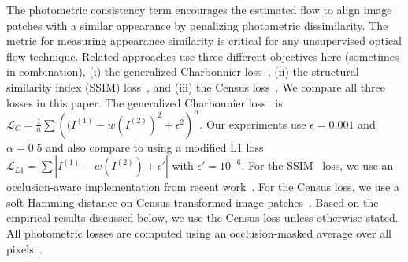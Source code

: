 \documentclass[runningheads]{llncs}
\newcommand{\lossfun}[1]{\mathcal{L}_\mathit{#1}}
\begin{document}
 The photometric consistency term encourages the estimated flow to align image patches with a similar appearance by penalizing photometric dissimilarity. The metric for measuring appearance similarity is critical for any unsupervised optical flow technique. Related approaches use three different objectives here (sometimes in combination), (i) the generalized Charbonnier loss~\cite{Janai2018ECCV,meister2018unflow,ren2017unsupervised,wang2018occlusion,jjyu2016unsupflow,Zhong2019UnsupervisedDE}, (ii) the structural similarity index (SSIM) loss~\cite{yin2018geonet,ranjan2019cvpr,wang2018unos}, and (iii) the Census loss~\cite{meister2018unflow,Zhong2019UnsupervisedDE,zou2018dfnet}. We compare all three losses in this paper.
The generalized Charbonnier loss~\cite{Sun2010} is $\lossfun{C}=\frac{1}{n}\sum\left((I^{(1)} - w(I^{(2)})^2 + \epsilon^2 \right)^\alpha$. Our experiments use $\epsilon=0.001$ and $\alpha=0.5$ and also compare to using a modified L1 loss $\lossfun{L1}=\sum|I^{(1)} - w(I^{(2)}) + \epsilon'|$ with $\epsilon'=10^{-6}$.
For the SSIM~\cite{Wang04imagequality} loss, we use an occlusion-aware implementation from recent work~\cite{Gordon2019}. For the Census loss, we use a soft Hamming distance on Census-transformed image patches~\cite{meister2018unflow}. Based on the empirical results discussed below, we use the Census loss unless otherwise stated. All photometric losses are computed using an occlusion-masked average over all pixels~\cite{wang2018occlusion}. 
\end{document}
